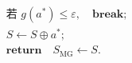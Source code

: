 \documentclass[border=10pt]{standalone}
\begin{document}
\begin{minipage}{9.2cm}
\large
\[
\begin{aligned}
&\text{若 } g(a^*) \le \varepsilon,\quad \mathbf{break};\\[0.8em]
&S \leftarrow S \oplus a^*;\\[0.8em]
&\mathbf{return}\quad S_{\mathrm{MG}}\leftarrow S.
\end{aligned}
\]
\end{minipage}
\end{document}
